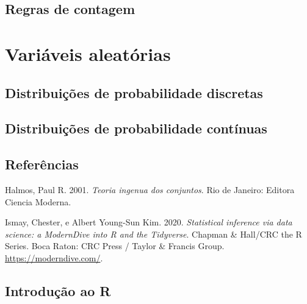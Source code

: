 \documentclass[
  letterpaper,
]{book}
\newlength{\cslhangindent}
\newenvironment{CSLReferences}[2] %
 {\begin{list}{}{%
  \setlength{\itemindent}{0pt}
  \setlength{\leftmargin}{0pt}
  \setlength{\parsep}{0pt}
  \ifodd #1
   \setlength{\leftmargin}{\cslhangindent}
   \setlength{\itemindent}{-1\cslhangindent}
  \fi
  \setlength{\itemsep}{#2\baselineskip}}}
 {\end{list}}
\theoremstyle{plain}
\theoremstyle{definition}
\theoremstyle{remark}
\begin{document}
\chapter{Regras de contagem}\label{regras-de-contagem}

\part{Variáveis aleatórias}

\chapter{Distribuições de probabilidade
discretas}\label{distribuiuxe7uxf5es-de-probabilidade-discretas}

\chapter{Distribuições de probabilidade
contínuas}\label{distribuiuxe7uxf5es-de-probabilidade-contuxednuas}


\chapter*{Referências}\label{referuxeancias}


\label{refs}
\begin{CSLReferences}{1}{0}
Halmos, Paul R. 2001. \emph{Teoria ingenua dos conjuntos}. Rio de
Janeiro: Editora Ciencia Moderna.

Ismay, Chester, e Albert Young-Sun Kim. 2020. \emph{Statistical
inference via data science: a {ModernDive} into {R} and the
{Tidyverse}}. Chapman \& {Hall}/{CRC} the {R} {Series}. Boca Raton: CRC
Press / Taylor \& Francis Group. \url{https://moderndive.com/}.

\end{CSLReferences}

\cleardoublepage
{}
{}
\appendix

\chapter{Introdução ao R}\label{introduuxe7uxe3o-ao-r}
\end{document}
